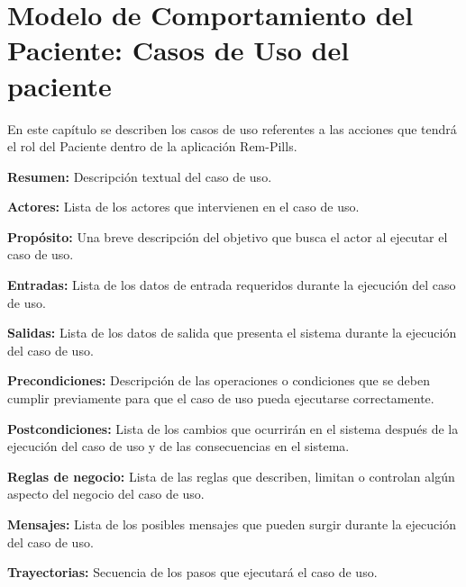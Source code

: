 \chapter{Modelo de Comportamiento del Paciente: Casos de Uso del paciente \label{chp:modeloComportamientoPaciente}}
\newpage
En este capítulo se describen los casos de uso referentes a las acciones que tendrá el rol del Paciente dentro de la aplicación Rem-Pills. \bigskip

\begin{objetivos}
	\item {\bf Resumen:} Descripción textual del caso de uso.
	\item {\bf Actores:} Lista de los actores que intervienen en el caso de uso.
	\item {\bf Propósito:} Una breve descripción del objetivo que busca el actor al ejecutar el caso de uso.
	\item {\bf Entradas:} Lista de los datos de entrada requeridos durante la ejecución del caso de uso.
	\item {\bf Salidas:} Lista de los datos de salida que presenta el sistema durante la ejecución del caso de uso.
	\item {\bf Precondiciones:} Descripción de las operaciones o condiciones que se deben cumplir previamente para que el caso de uso pueda ejecutarse correctamente.
	\item {\bf Postcondiciones:} Lista de los cambios que ocurrirán en el sistema después de la ejecución del caso de uso y de las consecuencias en el sistema.
	\item {\bf Reglas de negocio:} Lista de las reglas que describen, limitan o controlan algún aspecto del negocio del caso de uso.
	\item {\bf Mensajes:} Lista de los posibles mensajes que pueden surgir durante la ejecución del caso de uso.
	\item {\bf Trayectorias:} Secuencia de los pasos que ejecutará el caso de uso.
\end{objetivos}
%
